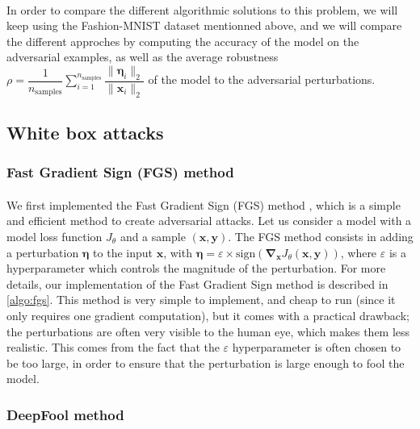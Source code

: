 \documentclass[11pt,twocolumn,letterpaper]{article}
\begin{document}
\paragraph{} In order to compare the different algorithmic solutions to this problem, we will keep using the Fashion-MNIST dataset mentionned above, and we will compare the different approches by computing the accuracy of the model on the adversarial examples, as well as the average robustness $\rho = \displaystyle \dfrac{1}{n_{\text{samples}}} \sum \limits_{i=1}^{n_{\text{samples}}} \dfrac{\|\bm{\eta}_i \|_2}{\|\bm{x}_i\|_2}$ of the model to the adversarial perturbations.

\subsection{White box attacks}

\subsubsection{Fast Gradient Sign (FGS) method}

\paragraph{} We first implemented the Fast Gradient Sign (FGS) method \cite{fast_gradient_sign}, which is a simple and efficient method to create adversarial attacks. Let us consider a model with a model loss function $J_{\theta}$ and a sample $(\bm{x}, \bm{y})$. The FGS method consists in adding a perturbation $\bm{\eta}$ to the input $\bm{x}$, with $\bm{\eta} = \varepsilon \times \text{sign}(\bm{\nabla}_{\bm{x}} J_{\theta}(\bm{x}, \bm{y}))$, where $\varepsilon$ is a hyperparameter which controls the magnitude of the perturbation. For more details, our implementation of the Fast Gradient Sign method is described in \ref{algo:fgs}. This method is very simple to implement, and cheap to run (since it only requires one gradient computation), but it comes with a practical drawback; the perturbations are often very visible to the human eye, which makes them less realistic. This comes from the fact that the $\varepsilon$ hyperparameter is often chosen to be too large, in order to ensure that the perturbation is large enough to fool the model. 

\subsubsection{DeepFool method}
\end{document}
